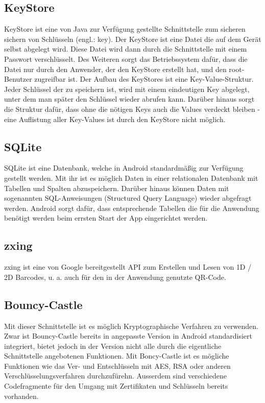 \documentclass[10pt, a4paper,headsepline]{scrreprt}
\begin{document}
\subsection{KeyStore}
KeyStore ist eine von Java zur Verfügung gestellte Schnittstelle zum sicheren sichern von Schlüsseln  (engl.: key). Der KeyStore ist eine Datei die auf dem Gerät selbst abgelegt wird. Diese Datei wird dann durch die Schnittstelle mit einem Passwort verschlüsselt. Des Weiteren sorgt das Betriebssystem dafür, dass die Datei nur durch den Anwender, der den KeyStore erstellt hat, und den root-Benutzer zugreifbar ist. Der Aufbau des KeyStores ist eine Key-Value-Struktur. Jeder Schlüssel der zu speichern ist, wird mit einem eindeutigen Key abgelegt, unter dem man später den Schlüssel wieder abrufen kann. Darüber hinaus sorgt die Struktur dafür, dass ohne die nötigen Keys auch die Values verdeckt bleiben - eine Auflistung aller Key-Values ist durch den KeyStore nicht möglich. %


\subsection{SQLite}
SQLite ist eine Datenbank, welche in Android standardmäßig zur Verfügung gestellt werden. Mit ihr ist es möglich Daten in einer relationalen Datenbank mit Tabellen und Spalten abzuspeichern. Darüber hinaus können Daten mit sogenannten SQL-Anweisungen (Structured Query Language) wieder abgefragt werden. Android sorgt dafür, dass entsprechende Tabellen die für die Anwendung benötigt werden beim errsten Start der App eingerichtet werden. 


\subsection{zxing}
zxing ist eine von Google bereitgestellt API zum Erstellen und Lesen von 1D / 2D Barcodes, u. a. auch für den in der Anwendung genutzte QR-Code.


\subsection{Bouncy-Castle}
Mit dieser Schnittstelle ist es möglich Kryptographische Verfahren zu verwenden. Zwar ist Bouncy-Castle bereits in angepasste Version in Android standardisiert integriert, bietet jedoch in der Version nicht alle durch die eigentliche Schnittstelle angebotenen Funktionen. Mit Boncy-Castle ist es mögliche Funktionen wie das Ver- und Entschlüsseln mit AES, RSA oder anderen Verschlüsselungsverfahren durchzufürehn. Ausserdem sind verschiedene Codefragmente für den Umgang mit Zertifikaten und Schlüsseln bereits vorhanden.
\end{document}
